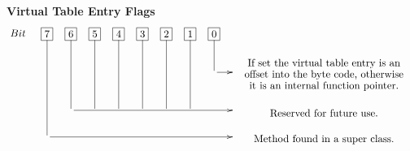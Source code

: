\textbf{Virtual Table Entry Flags}
\begin{displaymath}
  \xymatrix @-1pc {Bit &*+[F]{7} \ar @{-} [ddd]&*+[F]{6} \ar @{-} [dd] &*+[F]{5} \ar @{-} [dd] &*+[F]{4} \ar @{-} [dd] &*+[F]{3} \ar @{-} [dd] &*+[F]{2} \ar @{-} [dd]
    &*+[F]{1} \ar @{-} [dd] &*+[F]{0} \ar @{-} [d] & \\
    & & & & & & & & \ar [r] & \txt<6cm>{If set the virtual table entry is an offset into the byte code, otherwise it is an internal function pointer.}\\
    & & \ar [rrrrrrr] & & & & & & & \txt<6cm>{Reserved for future use.}\\
    & \ar [rrrrrrrr] & & & & & & & & \txt<6cm>{Method found in a super class.}}
\end{displaymath}
